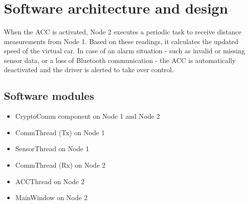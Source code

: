 \section{Software architecture and design}
\label{chapter2}

\paragraph
{}
When the ACC is activated, Node 2 executes a periodic task to receive distance measurements from Node 1. Based on these readings, it calculates the updated speed of the virtual car. In case of an alarm situation - such as invalid or missing sensor data, or a loss of Bluetooth communication - the ACC is automatically deactivated and the driver is alerted to take over control.

\subsection{Software modules}

\begin{itemize}
	\item CryptoComm component on Node 1 and Node 2
	\item CommThread (Tx) on Node 1
	\item SensorThread on Node 1
	\item CommThread (Rx) on Node 2
	\item ACCThread on Node 2
	\item MainWindow on Node 2
\end{itemize}

